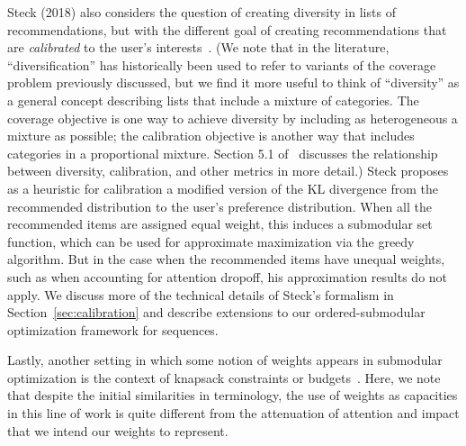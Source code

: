 
Steck (2018) also considers the question of creating diversity in lists of recommendations, but with the different goal of creating recommendations that are \emph{calibrated} to the user's interests~\cite{Steck18}. (We note that in the literature, ``diversification'' has historically been used to refer to variants of the coverage problem previously discussed, but we find it more useful to think of ``diversity'' as a general concept describing lists that include a mixture of categories. The coverage objective is one way to achieve diversity by including as heterogeneous a mixture as possible; the calibration objective is another way that includes categories in a proportional mixture. Section 5.1 of~\cite{Steck18} discusses the relationship between diversity, calibration, and other metrics in more detail.) Steck proposes as a heuristic for calibration a modified version of the KL divergence from the recommended distribution to the user's preference distribution. When all the recommended items are assigned equal weight, this induces a submodular set function, which can be used for approximate maximization via the greedy algorithm. But in the case when the recommended items have unequal weights, such as when accounting for attention dropoff, his approximation results do not apply. We discuss more of the technical details of Steck's formalism in Section~\ref{sec:calibration} and describe extensions to our ordered-submodular optimization framework for sequences.

Lastly, another setting in which some notion of weights appears in submodular optimization is the context of knapsack constraints or budgets~\cite{Sviridenko, Alon2012, SomaKIK14}. Here, we note that despite the initial similarities in terminology, the use of weights as capacities in this line of work is quite different from the attenuation of attention and impact that we intend our weights to represent.

%